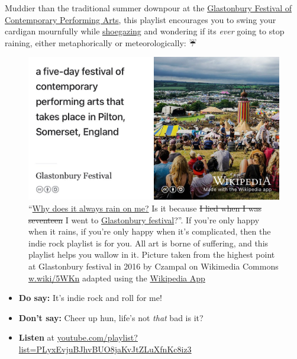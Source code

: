 \documentclass[
]{book}
\providecommand{\tightlist}{%
  \setlength{\itemsep}{0pt}\setlength{\parskip}{0pt}}
\begin{document}
Muddier than the traditional summer downpour at the \href{https://en.wikipedia.org/wiki/Glastonbury_Festival}{Glastonbury Festival of Contemporary Performing Arts}, this playlist encourages you to swing your cardigan mournfully while \href{https://en.wikipedia.org/wiki/Shoegaze}{shoegazing} and wondering if its \emph{ever} going to stop raining, either metaphorically or meteorologically: ☔️

\begin{figure}
\includegraphics[width=0.99\linewidth]{images/glastonbury-festival} \caption{``\href{https://en.wikipedia.org/wiki/Why_Does_It_Always_Rain_on_Me\%3F}{Why does it always rain on me?} Is it because \sout{I lied when I was seventeen} I went to \href{https://en.wikipedia.org/wiki/Glastonbury_Festival}{Glastonbury festival}?''. \citep{whydoesitalwaysrainonme} If you're only happy when it rains, if you're only happy when it's complicated, \citep{onlyhappy} then the indie rock playlist is for you. All art is borne of suffering, and this playlist helps you wallow in it. Picture taken from the highest point at Glastonbury festival in 2016 by Czampal on Wikimedia Commons \href{https://w.wiki/5WKn}{w.wiki/5WKn} adapted using the \href{https://apps.apple.com/gb/app/wikipedia/id324715238}{Wikipedia App}}\label{fig:glastonbury-fig}
\end{figure}



\begin{itemize}
\tightlist
\item
  \textbf{Do say:} It's indie rock and roll for me! \citep{indierocknroll}
\item
  \textbf{Don't say:} Cheer up hun, life's not \emph{that} bad is it? \citep{depressingindie}
\item
  \textbf{Listen} at \href{https://youtube.com/playlist?list=PLyxEvjuBJhvBUO8jaKvJtZLuXfnKc8iz3}{youtube.com/playlist?list=PLyxEvjuBJhvBUO8jaKvJtZLuXfnKc8iz3}
\end{itemize}
\end{document}
